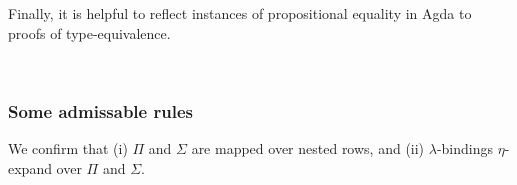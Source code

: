 \documentclass[authoryear, acmsmall, screen, review, nonacm]{acmart}
\begin{document}
\begin{code}
\AgdaSpace{}%
\AgdaSpace{}%
\AgdaSymbol{)}\AgdaSpace{}%
\AgdaSpace{}%
\AgdaSymbol{(}\AgdaSpace{}%
\AgdaSpace{}%
\AgdaSpace{}%
\AgdaSymbol{)}\AgdaSpace{}%
\AgdaSpace{}%
\AgdaSpace{}%
\AgdaSymbol{(}\AgdaSpace{}%
\AgdaSpace{}%
\AgdaSymbol{)}\AgdaSpace{}%
\AgdaSpace{}%
\<%
\end{code}

Finally, it is helpful to reflect instances of propositional equality in Agda to proofs of type-equivalence.

\begin{code}%
\>[0]\AgdaSpace{}%
\AgdaSymbol{:}\AgdaSpace{}%
\AgdaSpace{}%
\AgdaSymbol{\{}\AgdaSpace{}%
\AgdaSpace{}%
\AgdaSymbol{:}\AgdaSpace{}%
\AgdaSpace{}%
\AgdaSpace{}%
\AgdaSymbol{\}}\AgdaSpace{}%
\AgdaSpace{}%
\AgdaSpace{}%
\AgdaSpace{}%
\AgdaSpace{}%
\AgdaSpace{}%
\AgdaSpace{}%
\AgdaSpace{}%
\<%
\\
\>[0]\AgdaSpace{}%
\AgdaSpace{}%
\AgdaSymbol{=}\AgdaSpace{}%
\<%
\end{code}

\subsubsection{Some admissable rules} We confirm that (i) $\Pi$ and $\Sigma$ are mapped over nested rows, and (ii) $\lambda$-bindings $\eta$-expand over $\Pi$ and $\Sigma$.
\end{document}
